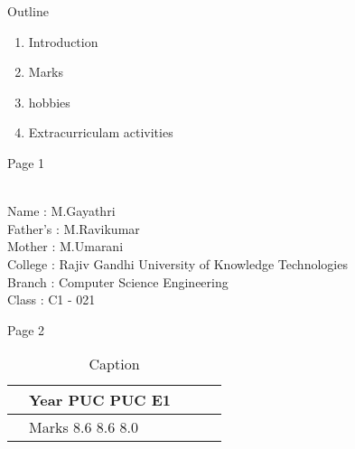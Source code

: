 \documentclass{beamer}
\author{M.Gayathri}
\date{\today}
\begin{document}
\begin{frame}
    \titlepage
\end{frame}

 \begin{frame}{Outline}
     \tableofcontents
     \begin{enumerate}
         \item Introduction
         \item Marks
         \item hobbies
         \item Extracurriculam activities
     \end{enumerate}
     
     
 \end{frame}
 \begin{frame}{Page 1}
 
 
 {\color{red}{INTRODUCTION}}\\
  Name : M.Gayathri\\
  Father's : M.Ravikumar\\
  Mother : M.Umarani\\
  College : Rajiv Gandhi University of Knowledge Technologies\\
  Branch : Computer Science Engineering\\
  Class : C1 - 021
  
 
 \end{frame}
 
 \begin{frame}{Page 2}
 
 
 
 {\color{purple}{MARKS}}
 \begin{table}[h]
     \centering
     \begin{tabular}{| l | l | l | l | l|}
          &Year  PUC PUC E1 \\
          \hline
          &Marks 8.6 8.6 8.0
     \end{tabular}
     \caption{Caption}
     \label{tab:my_label}
 \end{table}
 
     
 \end{frame}

%
\end{document}
